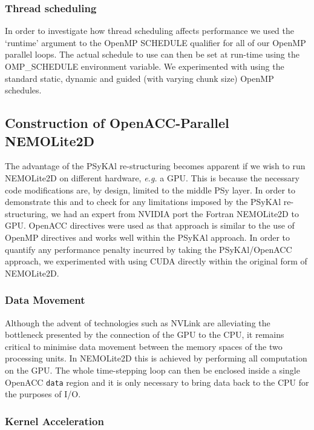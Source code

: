 \documentclass[gmdd, manuscript]{copernicus}
\begin{document}
\subsubsection{Thread scheduling}
\label{sec_scheduling}

In order to investigate how thread scheduling affects performance we
used the `runtime' argument to the OpenMP SCHEDULE qualifier for all
of our OpenMP parallel loops. The actual schedule to use can then be
set at run-time using the OMP\_SCHEDULE environment variable. We
experimented with using the standard static, dynamic and guided (with
varying chunk size) OpenMP schedules.

\subsection{Construction of OpenACC-Parallel NEMOLite2D}
\label{sec_oacc_steps}

The advantage of the {PS}y{KA}l re-structuring becomes apparent if we
wish to run NEMOLite2D on different hardware, \textit{e.g.} a
GPU. This is because the necessary code modifications are, by design,
limited to the middle PSy layer. In order to demonstrate this and to
check for any limitations imposed by the {PS}y{KA}l re-structuring, we
had an expert from NVIDIA port the Fortran NEMOLite2D to GPU. OpenACC
directives were used as that approach is similar to the use of OpenMP
directives and works well within the {PS}y{KA}l approach. In order to
quantify any performance penalty incurred by taking the
{PS}y{KA}l/OpenACC approach, we experimented with using CUDA directly
within the original form of NEMOLite2D.

\subsubsection{Data Movement}

Although the advent of technologies such as NVLink are alleviating the
bottleneck presented by the connection of the GPU to the CPU, it
remains critical to minimise data movement between the memory spaces
of the two processing units. In NEMOLite2D this is achieved by
performing all computation on the GPU. The whole time-stepping loop
can then be enclosed inside a single OpenACC \texttt{data} region and it
is only necessary to bring data back to the CPU for the purposes
of I/O.

\subsubsection{Kernel Acceleration}
\end{document}
